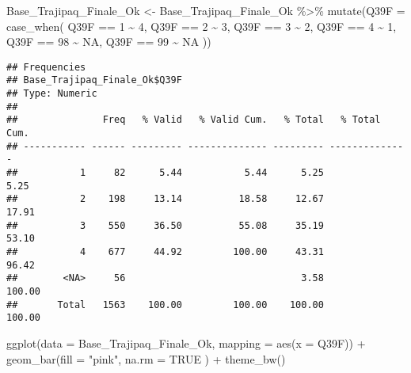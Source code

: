 \documentclass[
]{article}
\newenvironment{Shaded}{\begin{snugshade}}{\end{snugshade}}
\newcommand{\AttributeTok}[1]{\textcolor[rgb]{0.77,0.63,0.00}{#1}}
\newcommand{\ConstantTok}[1]{\textcolor[rgb]{0.00,0.00,0.00}{#1}}
\newcommand{\DecValTok}[1]{\textcolor[rgb]{0.00,0.00,0.81}{#1}}
\newcommand{\FunctionTok}[1]{\textcolor[rgb]{0.00,0.00,0.00}{#1}}
\newcommand{\NormalTok}[1]{#1}
\newcommand{\OtherTok}[1]{\textcolor[rgb]{0.56,0.35,0.01}{#1}}
\newcommand{\SpecialCharTok}[1]{\textcolor[rgb]{0.00,0.00,0.00}{#1}}
\newcommand{\StringTok}[1]{\textcolor[rgb]{0.31,0.60,0.02}{#1}}
\begin{document}
\begin{Shaded}
\begin{Highlighting}[]
\NormalTok{Base\_Trajipaq\_Finale\_Ok }\OtherTok{\textless{}{-}}
\NormalTok{  Base\_Trajipaq\_Finale\_Ok }\SpecialCharTok{\%\textgreater{}\%}
  \FunctionTok{mutate}\NormalTok{(}\AttributeTok{Q39F =} \FunctionTok{case\_when}\NormalTok{(}
\NormalTok{    Q39F }\SpecialCharTok{==} \DecValTok{1} \SpecialCharTok{\textasciitilde{}} \DecValTok{4}\NormalTok{,}
\NormalTok{    Q39F }\SpecialCharTok{==} \DecValTok{2} \SpecialCharTok{\textasciitilde{}} \DecValTok{3}\NormalTok{,}
\NormalTok{    Q39F }\SpecialCharTok{==} \DecValTok{3} \SpecialCharTok{\textasciitilde{}} \DecValTok{2}\NormalTok{,}
\NormalTok{    Q39F }\SpecialCharTok{==} \DecValTok{4} \SpecialCharTok{\textasciitilde{}} \DecValTok{1}\NormalTok{,}
\NormalTok{    Q39F }\SpecialCharTok{==} \DecValTok{98} \SpecialCharTok{\textasciitilde{}} \ConstantTok{NA}\NormalTok{,}
\NormalTok{    Q39F }\SpecialCharTok{==} \DecValTok{99} \SpecialCharTok{\textasciitilde{}} \ConstantTok{NA}
\NormalTok{  ))}
\end{Highlighting}
\end{Shaded}

\begin{Shaded}
\end{Shaded}

\begin{verbatim}
## Frequencies  
## Base_Trajipaq_Finale_Ok$Q39F  
## Type: Numeric  
## 
##               Freq   % Valid   % Valid Cum.   % Total   % Total Cum.
## ----------- ------ --------- -------------- --------- --------------
##           1     82      5.44           5.44      5.25           5.25
##           2    198     13.14          18.58     12.67          17.91
##           3    550     36.50          55.08     35.19          53.10
##           4    677     44.92         100.00     43.31          96.42
##        <NA>     56                               3.58         100.00
##       Total   1563    100.00         100.00    100.00         100.00
\end{verbatim}

\begin{Shaded}
\begin{Highlighting}[]
\FunctionTok{ggplot}\NormalTok{(}\AttributeTok{data =}\NormalTok{ Base\_Trajipaq\_Finale\_Ok, }\AttributeTok{mapping =} \FunctionTok{aes}\NormalTok{(}\AttributeTok{x =}\NormalTok{ Q39F)) }\SpecialCharTok{+}
  \FunctionTok{geom\_bar}\NormalTok{(}\AttributeTok{fill =} \StringTok{"pink"}\NormalTok{,}
           \AttributeTok{na.rm =} \ConstantTok{TRUE}
\NormalTok{           ) }\SpecialCharTok{+}
  \FunctionTok{theme\_bw}\NormalTok{()}
\end{Highlighting}
\end{Shaded}
\end{document}
